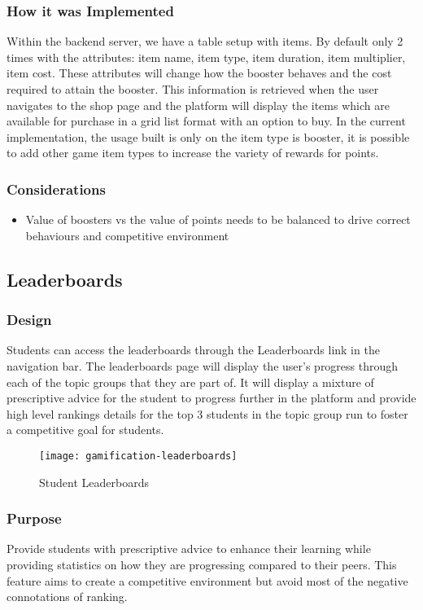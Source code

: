 \subsubsection{How it was Implemented}
Within the backend server, we have a table setup with items. By default only 2 times with the attributes: item name, item type, item duration, item multiplier, item cost. These attributes will change how the booster behaves and the cost required to attain the booster. This information is retrieved when the user navigates to the shop page and the platform will display the items which are available for purchase in a grid list format with an option to buy. In the current implementation, the usage built is only on the item type is booster, it is possible to add other game item types to increase the variety of rewards for points.

\subsubsection{Considerations}
\begin{itemize}
    \item Value of boosters vs the value of points needs to be balanced to drive correct behaviours and competitive environment
\end{itemize}

\newpage

\subsection{Leaderboards}
\subsubsection{Design}
Students can access the leaderboards through the Leaderboards link in the navigation bar. The leaderboards page will display the user’s progress through each of the topic groups that they are part of. It will display a mixture of prescriptive advice for the student to progress further in the platform and provide high level rankings details for the top 3 students in the topic group run to foster a competitive goal for students.

\begin{figure}[h!]
    \texttt{[image: gamification-leaderboards]}
    \centering
    \caption{Student Leaderboards}
\end{figure}

\newpage

\subsubsection{Purpose}
Provide students with prescriptive advice to enhance their learning while providing statistics on how they are progressing compared to their peers. This feature aims to create a competitive environment but avoid most of the negative connotations of ranking.

